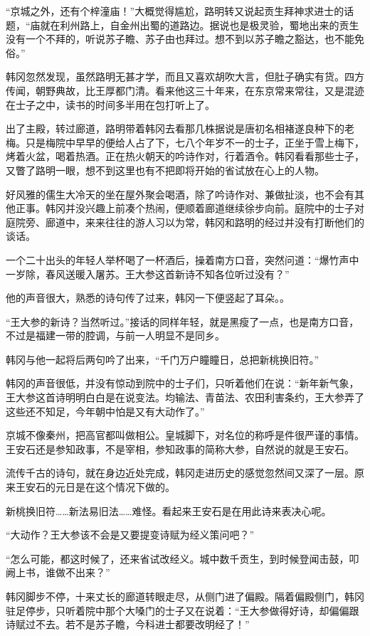 “京城之外，还有个梓潼庙！”大概觉得尴尬，路明转又说起贡生拜神求进士的话题，“庙就在利州路上，自金州出蜀的道路边。据说也是极灵验，蜀地出来的贡生没有一个不拜的，听说苏子瞻、苏子由也拜过。想不到以苏子瞻之豁达，也不能免俗。”

韩冈忽然发现，虽然路明无甚才学，而且又喜欢胡吹大言，但肚子确实有货。四方传闻，朝野典故，比王厚都门清。看来他这三十年来，在东京常来常往，又是混迹在士子之中，读书的时间多半用在包打听上了。

出了主殿，转过廊道，路明带着韩冈去看那几株据说是唐初名相褚遂良种下的老梅。只是梅院中早早的便给人占了下，七八个年岁不一的士子，正坐于雪上梅下，烤着火盆，喝着热酒。正在热火朝天的吟诗作对，行着酒令。韩冈看看那些士子，又瞥了路明一眼，想不到这里也有不把即将开始的省试放在心上的人物。

好风雅的儒生大冷天的坐在屋外聚会喝酒，除了吟诗作对、兼做扯淡，也不会有其他正事。韩冈并没兴趣上前凑个热闹，便顺着廊道继续徐步向前。庭院中的士子对庭院旁、廊道中，来来往往的游人习以为常，韩冈和路明的经过并没有打断他们的谈话。

一个二十出头的年轻人举杯喝了一杯酒后，操着南方口音，突然问道：“爆竹声中一岁除，春风送暖入屠苏。王大参这首新诗不知各位听过没有？”

他的声音很大，熟悉的诗句传了过来，韩冈一下便竖起了耳朵。。

“王大参的新诗？当然听过。”接话的同样年轻，就是黑瘦了一点，也是南方口音，不过是福建一带的腔调，与前一人明显不是同乡。

韩冈与他一起将后两句吟了出来，“千门万户瞳瞳日，总把新桃换旧符。”

韩冈的声音很低，并没有惊动到院中的士子们，只听着他们在说：“新年新气象，王大参这首诗明明白白是在说变法。均输法、青苗法、农田利害条约，王大参弄了这些还不知足，今年朝中怕是又有大动作了。”

京城不像秦州，把高官都叫做相公。皇城脚下，对名位的称呼是件很严谨的事情。王安石还是参知政事，不是宰相，参知政事的简称大参，自然说的就是王安石。

流传千古的诗句，就在身边近处完成，韩冈走进历史的感觉忽然间又深了一层。原来王安石的元日是在这个情况下做的。

新桃换旧符……新法易旧法……难怪。看起来王安石是在用此诗来表决心呢。

“大动作？王大参该不会是又要提变诗赋为经义策问吧？”

“怎么可能，都这时候了，还来省试改经义。城中数千贡生，到时候登闻击鼓，叩阙上书，谁做不出来？”

韩冈脚步不停，十来丈长的廊道转眼走尽，从侧门进了偏殿。隔着偏殿侧门，韩冈驻足停步，只听着院中那个大嗓门的士子又在说着：“王大参做得好诗，却偏偏跟诗赋过不去。若不是苏子瞻，今科进士都要改明经了！”

